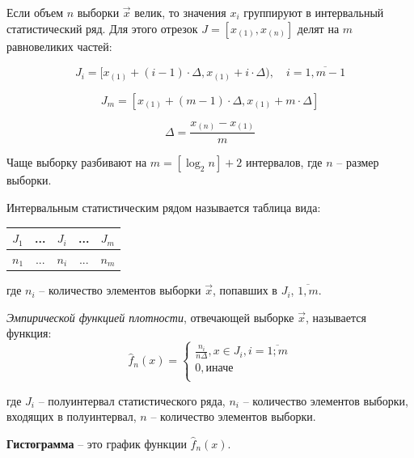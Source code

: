 Если объем $n$ выборки $\vec x$ велик, то значения $x_i$ группируют в интервальный статистический ряд. Для этого отрезок $J = [x_{(1)}, x_{(n)}]$ делят на $m$ равновеликих частей:

\begin{equation*}
 J_i = [x_{(1)} + (i - 1) \cdot \Delta, x_{(1)} + i \cdot \Delta),\quad i = \overline{1, m - 1}
\end{equation*}

\begin{equation*}
 J_{m} = [x_{(1)} + (m - 1) \cdot \Delta, x_{(1)} + m \cdot \Delta]
\end{equation*}

\begin{equation*}
 \Delta = \frac{x_{(n)} - x_{(1)}}{m}
\end{equation*}

Чаще выборку разбивают на $m=[\log_2n]+2$ интервалов, где $n$ -- размер выборки.

Интервальным статистическим рядом называется таблица вида:

\begin{table}[h!]
 \centering
 \begin{tabular}{|c|c|c|c|c|}
  \hline
  $J_1$ & ... & $J_i$ & ... & $J_m$ \\
  \hline
  $n_1$ & ... & $n_i$ & ... & $n_m$ \\
  \hline
 \end{tabular}
\end{table}

где $n_i$ -- количество элементов выборки $\vec x$, попавших в $J_i$, $\overline{1, m}$.

\textit{Эмпирической функцией плотности}, отвечающей выборке $\vec x$, называется функция:
\begin{equation}
 \hat f_n(x) =
 \begin{cases}
 \frac{n_i}{n \Delta}, x \in J_i, i = \overline{1; m} \\
 0, \text{иначе} \\
 \end{cases}
\end{equation}

где $J_i$ -- полуинтервал статистического ряда, $n_i$ -- количество элементов выборки, входящих в полуинтервал, $n$ -- количество элементов выборки.





\textbf{Гистограмма} -- это график функции $\hat f_n(x)$. 

